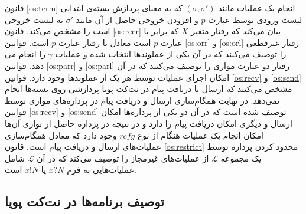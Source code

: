 \documentclass[
msc,
irfonts
]{./tex/tehran-thesis}
\newcommand{\پ}{پروژه/پایان‌نامه/رساله }
\theoremstyle{definition}
\theoremstyle{theorem}
\theoremstyle{definition}
\numberwithin{algorithm}{chapter}
\newcommand{\mc}[1]{\mathcal{#1}}
\newcommand{\lf}[1]{\LTRfootnote{#1}}
\begin{document}
قانون 
\ref{os:term}
انجام یک عملیات مانند
$(\sigma,\sigma')$
که به معنای
پردازش بسته‌ی ابتدایی لیست ورودی توسط عبارت 
$p$
و افزودن خروجی حاصل از آن مانند 
$\sigma'$
به لیست خروجی است را مشخص می‌کند.
قانون 
\ref{os:recr}
بیان می‌کند که رفتار متغیر 
$X$
که برابر با عبارت 
$p$
است معادل با رفتار عبارت 
$p$
است.
قوانین 
\ref{os:orr}
و
\ref{os:orl}
رفتار غیرقطعی را توصیف می‌کنند که در آن یکی از عملوند‌ها انتخاب شده و عملیات 
$\gamma$
را انجام می دهد.
قوانین
\ref{os:parr}
و
\ref{os:parl}
رفتار دو عبارت موازی را توصیف می‌کنند که در آن امکان اجرای عملیات توسط هر یک از عملوندها وجود دارد.
قوانین
\ref{os:recv}
و
\ref{os:send}
مشخص می‌کنند که ارسال یا دریافت پیام در نت‌کت پویا پردازشی روی بسته‌ها انجام نمی‌دهد.
در نهایت همگام‌سازی\lf{Synchronization}
ارسال و دریافت پیام در پردازه‌های موازی توسط قوانین 
\ref{os:recv}
و
\ref{os:send}
توصیف شده است که در آن دو یکی از پردازه‌ها امکان ارسال و دیگری امکان دریافت پیام را دارد و در نتیجه در پردازه‌ حاصل از توازی آن‌ها امکان انجام یک عملیات هنگام از نوع 
$rcfg$
وجود دارد که معادل همگام‌سازی عملیات‌های ارسال و دریافت پیام است.
قانون
\ref{os:restrict}
محدود کردن پردازه توسط یک مجموعه 
$\mc{L}$
از عملیات‌های غیرمجاز را توصیف می‌کند که در آن
$\mc{L}$
شامل عملیات‌هایی به فرم 
$x?N$
یا
$x!N$
است. 

\subsection{توصیف برنامه‌ها در نت‌کت پویا}
\end{document}

